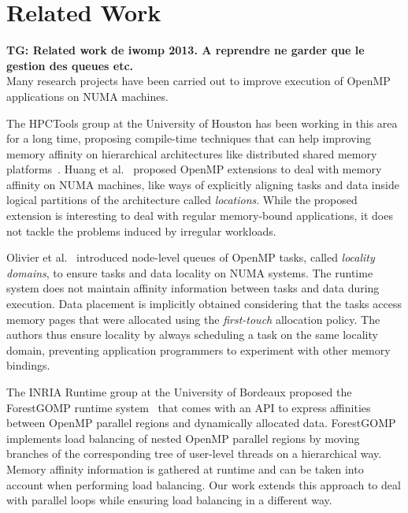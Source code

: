 \documentclass{Styles/llncs}
\newcommand{\TG}[1]{{\color{red}\bfseries TG: #1}}
\begin{document}
\section{Related Work}
\label{sec:related_work}

\TG{Related work de iwomp 2013. A reprendre ne garder que le gestion des queues etc.}\\

Many research projects have been carried out to improve execution of
OpenMP applications on NUMA machines.

The HPCTools group at the University of Houston has been working in
this area for a long time, proposing compile-time techniques that can
help improving memory affinity on hierarchical architectures like
distributed shared memory
platforms~\cite{Marowka:2004:OAD:1064428.1064431}. Huang et
al.~\cite{Huang-Chapman-locality-OpenMP} proposed OpenMP extensions to
deal with memory affinity on NUMA machines, like ways of explicitly
aligning tasks and data inside logical partitions of the architecture
called \textit{locations}. While the proposed extension is interesting
to deal with regular memory-bound applications, it does not tackle
the problems induced by irregular workloads.

Olivier et
al.~\cite{Olivier-pre-queue-Bronis,Olivier:2012:CMW:2388996.2389085}
introduced node-level queues of OpenMP tasks, called \textit{locality
  domains}, to ensure tasks and data locality on NUMA systems. The
runtime system does not maintain affinity information between tasks
and data during execution. Data placement is implicitly obtained
considering that the tasks access memory pages that were allocated
using the \textit{first-touch} allocation policy. The authors thus
ensure locality by always scheduling a task on the same locality
domain, preventing application programmers to experiment with other
memory bindings.

The INRIA Runtime group at the University of Bordeaux proposed the
ForestGOMP runtime system~\cite{BroAumGogThiWacNam10IPDPS} that comes
with an API to express affinities between OpenMP parallel regions and
dynamically allocated data. ForestGOMP implements load balancing of
nested OpenMP parallel regions by moving branches of the corresponding
tree of user-level threads on a hierarchical way. Memory affinity
information is gathered at runtime and can be taken into account when
performing load balancing. Our work extends this approach to deal with
parallel loops while ensuring load balancing in a different way.
\end{document}
